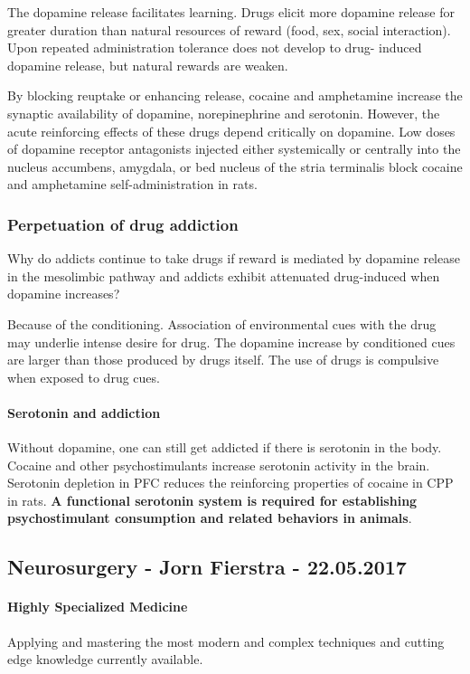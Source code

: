\documentclass[12pt,article,oneside,a4paper]{memoir}
\begin{document}
The dopamine release facilitates learning. Drugs elicit more dopamine release
for greater duration than natural resources of reward (food, sex, social
interaction). Upon repeated administration tolerance does not develop to drug-
induced dopamine release, but natural rewards are weaken.

By blocking reuptake or enhancing release, cocaine and amphetamine increase
the synaptic availability of dopamine, norepinephrine and serotonin. However,
the acute reinforcing effects of these drugs depend critically on dopamine.
Low doses of dopamine receptor antagonists injected either systemically or
centrally into the nucleus accumbens, amygdala, or bed nucleus of the stria
terminalis block cocaine and amphetamine self-administration in rats.

\subsubsection{Perpetuation of drug addiction}
Why do addicts continue to take drugs if reward is mediated by dopamine release
in the mesolimbic pathway and addicts exhibit attenuated drug-induced when
dopamine increases?

Because of the conditioning. Association of environmental cues with the drug may
underlie intense desire for drug. The dopamine increase by conditioned cues are
larger than those produced by drugs itself. The use of drugs is compulsive when
exposed to drug cues.

\paragraph{Serotonin and addiction}
Without dopamine, one can still get addicted if there is serotonin in the body.
Cocaine and other psychostimulants increase serotonin activity in the brain.
Serotonin depletion in PFC reduces the reinforcing properties of cocaine in CPP
in rats. \textbf{A functional serotonin system is required for establishing
psychostimulant consumption and related behaviors in animals}.

\newpage
\subsection{Neurosurgery - Jorn Fierstra - 22.05.2017}
\paragraph{Highly Specialized Medicine}
Applying and mastering the most modern and complex techniques and cutting edge
knowledge currently available.
\end{document}
